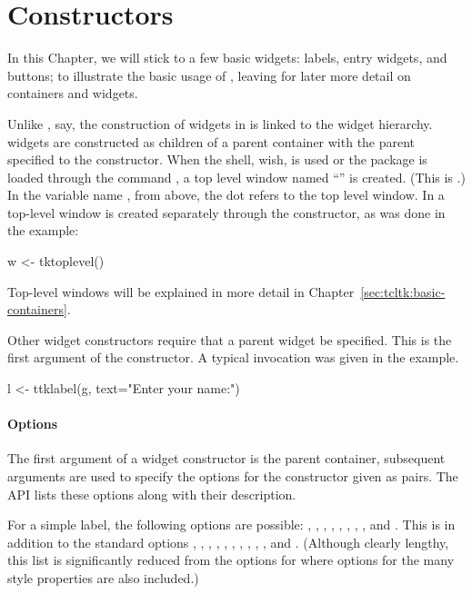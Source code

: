 
\section{Constructors}
\label{sec:tcltk:constructors}

In this Chapter, we will stick to a few basic widgets: labels, entry
widgets, and buttons; to illustrate the basic usage of ,
leaving for later more detail on containers and widgets.

Unlike \GTK, say, the construction of widgets in  is linked
to the widget hierarchy. \TK\/ widgets are constructed as children of
a parent container with the parent specified to the constructor. When
the \TK\/ shell, wish, is used or the \TK\/ package is loaded through
the \TCL\/ command , a top level window named
``'' is created. (This is .) In the variable name , from
above, the dot refers to the top level window.  In  a
top-level window is created separately through the
 constructor, as was done in the example:
\begin{Schunk}
\begin{Sinput}
 w <- tktoplevel()
\end{Sinput}
\end{Schunk}

Top-level windows will be explained in more detail in
Chapter~\ref{sec:tcltk:basic-containers}. 

Other widget constructors require that a parent widget be
specified. This is the first argument of the constructor.  A typical
invocation was given in the example.
\begin{Schunk}
\begin{Sinput}
 l <- ttklabel(g, text="Enter your name:")
\end{Sinput}
\end{Schunk}
%

\paragraph{Options}
The first argument of a widget constructor is the parent container,
subsequent arguments are used to specify the options for the
constructor given as  pairs. The \TK\/ API lists these
options along with their description.

For a simple label, the following options are possible: ,
, , , ,
, , , and .
This is in addition to the standard options ,
, , , ,
, , , ,
, and . (Although clearly lengthy, this
list is significantly reduced from the options for 
where options for the many style properties are also included.)

